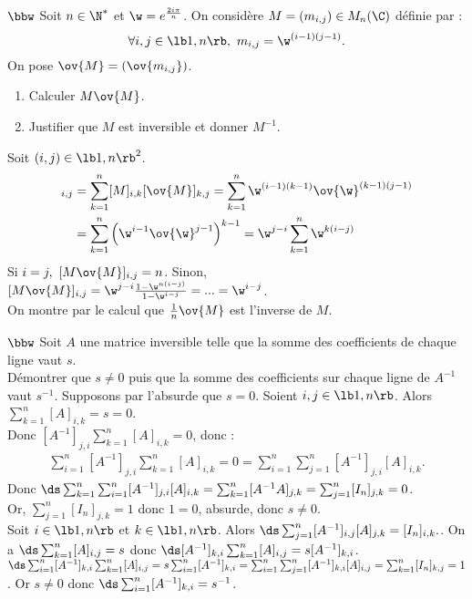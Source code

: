 \documentclass[11pt]{article}
\begin{document}
\begin{exercice}{$\bbw$}{}
    Soit $n\in\N^*$ et $\w=e^{\frac{2i\pi}{n}}$. On considère $M=(m_{i,j})\in M_n(\C)$ définie par :
    \begin{equation*}
        \forall i,j \in \lb1,n\rb, ~ m_{i,j}=\w^{(i-1)(j-1)}.
    \end{equation*}
    On pose $\ov{M}=(\ov{m_{i,j}})$.
    \begin{enumerate}
        \item Calculer $M\ov{M}$.
        \item Justifier que $M$ est inversible et donner $M^{-1}$.
    \end{enumerate}
    \tcblower
     Soit $(i,j)\in\lb1,n\rb^2$.
    \begin{align*}
        [M\ov{M}]_{i,j}&=\sum_{k=1}^n[M]_{i,k}[\ov{M}]_{k,j}=\sum_{k=1}^n\w^{(i-1)(k-1)}\ov{\w}^{(k-1)(j-1)}\\
        &=\sum_{k=1}^n\left(\w^{i-1}\ov{\w}^{j-1}\right)^{k-1}=\w^{j-i}\sum_{k=1}^n\w^{k(i-j)}
    \end{align*}
    Si $i=j, ~ [M\ov{M}]_{i,j}=n$. Sinon, $[M\ov{M}]_{i,j}=\w^{j-i}\frac{1-\w^{n(i-j)}}{1-\w^{i-j}}=...=\w^{i-j}$.\\
     On montre par le calcul que $\frac{1}{n}\ov{M}$ est l'inverse de $M$.
\end{exercice}

\vspace*{-0.3cm}

\begin{exercice}{$\bbw$}{}
    Soit $A$ une matrice inversible telle que la somme des coefficients de chaque ligne vaut $s$.\\
    Démontrer que $s\neq0$ puis que la somme des coefficients sur chaque ligne de $A^{-1}$ vaut $s^{-1}$.
    \tcblower
    Supposons par l'absurde que $s=0$. Soient $i,j\in\lb1,n\rb$. Alors $\sum_{k=1}^n[A]_{i,k}=s=0$.\\
    Donc $[A^{-1}]_{j,i}\sum_{k=1}^n[A]_{i,k}=0$, donc :
    \begin{align*}
        \sum_{i=1}^n[A^{-1}]_{j,i}\sum_{k=1}^n[A]_{i,k}=0=\sum_{i=1}^n\sum_{j=1}^n[A^{-1}]_{j,i}[A]_{i,k}.
    \end{align*}
    Donc $\ds\sum_{k=1}^n\sum_{i=1}^n[A^{-1}]_{j,i}[A]_{i,k}=\sum_{k=1}^n[A^{-1}A]_{j,k}=\sum_{j=1}^n[I_n]_{j,k}=0$.\\
    Or, $\sum_{j=1}^n[I_n]_{j,k}=1$ donc $1=0$, absurde, donc $s\neq0$.\\
    Soit $i\in\lb1,n\rb$ et $k\in\lb1,n\rb$. Alors $\ds\sum_{j=1}^n[A^{-1}]_{i,j}[A]_{j,k}=[I_n]_{i,k}.$. On a $\ds\sum_{k=1}^n[A]_{i,j}=s$ donc $\ds[A^{-1}]_{k,i}\sum_{k=1}^n[A]_{i,j}=s[A^{-1}]_{k,i}$.\\
    $\ds\sum_{i=1}^n[A^{-1}]_{k,i}\sum_{k=1}^n[A]_{i,j}=s\sum_{i=1}^n[A^{-1}]_{k,i}=\sum_{i=1}^n\sum_{j=1}^n[A^{-1}]_{k,i}[A]_{i,j}=\sum_{k=1}^n[I_n]_{k,j}=1$. Or $s\neq0$ donc $\ds\sum_{i=1}^n[A^{-1}]_{k,i}=s^{-1}$.
\end{exercice}
\end{document}
